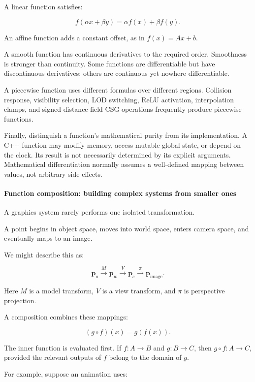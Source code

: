 A linear function satisfies:

\[
f(\alpha x+\beta y)=\alpha f(x)+\beta f(y).
\]

An affine function adds a constant offset, as in \(f(x)=Ax+b\).

A smooth function has continuous derivatives to the required order. Smoothness is stronger than continuity. Some functions are differentiable but have discontinuous derivatives; others are continuous yet nowhere differentiable.

A piecewise function uses different formulas over different regions. Collision response, visibility selection, LOD switching, ReLU activation, interpolation clamps, and signed-distance-field CSG operations frequently produce piecewise functions.

Finally, distinguish a function's mathematical purity from its implementation. A C++ function may modify memory, access mutable global state, or depend on the clock. Its result is not necessarily determined by its explicit arguments. Mathematical differentiation normally assumes a well-defined mapping between values, not arbitrary side effects.

\paragraph{Function composition: building complex systems from smaller ones}\label{01-foundations-i-ch020-function-composition-building-complex-systems-from-smaller-ones}

A graphics system rarely performs one isolated transformation.

A point begins in object space, moves into world space, enters camera space, and eventually maps to an image.

We might describe this as:

\[
\mathbf p_o \xrightarrow{M} \mathbf p_w \xrightarrow{V} \mathbf p_c \xrightarrow{\pi} \mathbf p_{\text{image}}.
\]

Here \(M\) is a model transform, \(V\) is a view transform, and \(\pi\) is perspective projection.

A composition combines these mappings:

\[
(g\circ f)(x)=g(f(x)).
\]

The inner function is evaluated first. If \(f:A\to B\) and \(g:B\to C\), then \(g\circ f:A\to C\), provided the relevant outputs of \(f\) belong to the domain of \(g\).

For example, suppose an animation uses:

